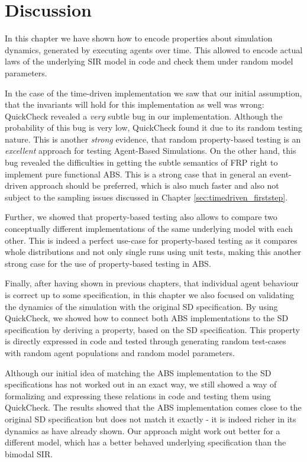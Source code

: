 \section{Discussion}
In this chapter we have shown how to encode properties about simulation dynamics, generated by executing agents over time. This allowed to encode actual laws of the underlying SIR model in code and check them under random model parameters.

In the case of the time-driven implementation we saw that our initial assumption, that the invariants will hold for this implementation as well was wrong: QuickCheck revealed a \textit{very} subtle bug in our implementation. Although the probability of this bug is very low, QuickCheck found it due to its random testing nature. This is another \textit{strong} evidence, that random property-based testing is an \textit{excellent} approach for testing Agent-Based Simulations. On the other hand, this bug revealed the difficulties in getting the subtle semantics of FRP right to implement pure functional ABS. This is a strong case that in general an event-driven approach should be preferred, which is also much faster and also not subject to the sampling issues discussed in Chapter \ref{sec:timedriven_firststep}.

Further, we showed that property-based testing also allows to compare two conceptually different implementations of the same underlying model with each other. This is indeed a perfect use-case for property-based testing as it compares whole distributions and not only single runs using unit tests, making this another strong case for the use of property-based testing in ABS.

Finally, after having shown in previous chapters, that individual agent behaviour is correct up to some specification, in this chapter we also focused on validating the dynamics of the simulation with the original SD specification. By using QuickCheck, we showed how to connect both ABS implementations to the SD specification by deriving a property, based on the SD specification. This property is directly expressed in code and tested through generating random test-cases with random agent populations and random model parameters. 

Although our initial idea of matching the ABS implementation to the SD specifications has not worked out in an exact way, we still showed a way of formalizing and expressing these relations in code and testing them using QuickCheck. The results showed that the ABS implementation comes close to the original SD specification but does not match it exactly - it is indeed richer in its dynamics as \cite{figueredo_comparing_2014,macal_agent-based_2010} have already shown. Our approach might work out better for a different model, which has a better behaved underlying specification than the bimodal SIR.
